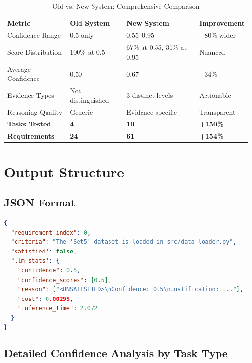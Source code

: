 \documentclass[11pt,a4paper]{article}
\begin{document}
\begin{table}[H]
\centering
\caption{Old vs. New System: Comprehensive Comparison}
\begin{tabularx}{\textwidth}{lXXl}
\toprule
\textbf{Metric} & \textbf{Old System} & \textbf{New System} & \textbf{Improvement} \\
\midrule
Confidence Range & 0.5 only & 0.55--0.95 & +80\% wider \\
Score Distribution & 100\% at 0.5 & 67\% at 0.55, 31\% at 0.95 & Nuanced \\
Average Confidence & 0.50 & 0.67 & +34\% \\
Evidence Types & Not distinguished & 3 distinct levels & Actionable \\
Reasoning Quality & Generic & Evidence-specific & Transparent \\
\midrule
\textbf{Tasks Tested} & \textbf{4} & \textbf{10} & \textbf{+150\%} \\
\textbf{Requirements} & \textbf{24} & \textbf{61} & \textbf{+154\%} \\
\bottomrule
\end{tabularx}
\label{tab:comparison}
\end{table}

\section{Output Structure}

\subsection{JSON Format}

\begin{lstlisting}[language=json, caption={Complete Output Structure}]
{
  "requirement_index": 0,
  "criteria": "The 'Set5' dataset is loaded in src/data_loader.py",
  "satisfied": false,
  "llm_stats": {
    "confidence": 0.5,
    "confidence_scores": [0.5],
    "reason": ["<UNSATISFIED>\nConfidence: 0.5\nJustification: ..."],
    "cost": 0.00295,
    "inference_time": 2.072
  }
}
\end{lstlisting}

\subsection{Detailed Confidence Analysis by Task Type}
\end{document}
